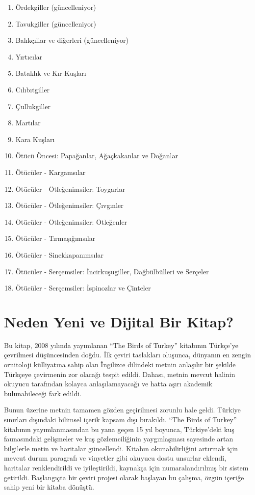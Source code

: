 \documentclass[
  letterpaper,
  DIV=11,
  numbers=noendperiod]{scrreprt}
\providecommand{\tightlist}{%
  \setlength{\itemsep}{0pt}\setlength{\parskip}{0pt}}\usepackage{longtable,booktabs,array}
\begin{document}
\begin{enumerate}
\def\labelenumi{\arabic{enumi}.}
\tightlist
\item
  Ördekgiller (güncelleniyor)
\item
  Tavukgiller (güncelleniyor)
\item
  Balıkçıllar ve diğerleri (güncelleniyor)
\item
  Yırtıcılar
\item
  Bataklık ve Kır Kuşları
\item
  Cılıbıtgiller
\item
  Çullukgiller
\item
  Martılar
\item
  Kara Kuşları
\item
  Ötücü Öncesi: Papağanlar, Ağaçkakanlar ve Doğanlar
\item
  Ötücüler - Kargamsılar
\item
  Ötücüler - Ötleğenimsiler: Toygarlar
\item
  Ötücüler - Ötleğenimsiler: Çıvgınler
\item
  Ötücüler - Ötleğenimsiler: Ötleğenler
\item
  Ötücüler - Tırmaşığımsılar
\item
  Ötücüler - Sinekkapanımsılar
\item
  Ötücüler - Serçemsiler: İncirkuşugiller, Dağbülbülleri ve Serçeler
\item
  Ötücüler - Serçemsiler: İspinozlar ve Çinteler
\end{enumerate}

\section*{Neden Yeni ve Dijital Bir
Kitap?}\label{neden-yeni-ve-dijital-bir-kitap}


Bu kitap, 2008 yılında yayımlanan ``The Birds of Turkey'' kitabının
Türkçe'ye çevrilmesi düşüncesinden doğdu. İlk çeviri taslakları
oluşunca, dünyanın en zengin ornitoloji külliyatına sahip olan İngilizce
dilindeki metnin anlaşılır bir şekilde Türkçeye çevirmenin zor olacağı
tespit edildi. Dahası, metnin mevcut halinin okuyucu tarafından kolayca
anlaşılamayacağı ve hatta aşırı akademik bulunabileceği fark edildi.

Bunun üzerine metnin tamamen gözden geçirilmesi zorunlu hale geldi.
Türkiye sınırları dışındaki bilimsel içerik kapsam dışı bırakıldı. ``The
Birds of Turkey'' kitabının yayımlanmasından bu yana geçen 15 yıl
boyunca, Türkiye'deki kuş faunasındaki gelişmeler ve kuş gözlemciliğinin
yaygınlaşması sayesinde artan bilgilerle metin ve haritalar güncellendi.
Kitabın okunabilirliğini artırmak için mevcut durum paragrafı ve
vinyetler gibi okuyucu dostu unsurlar eklendi, haritalar renklendirildi
ve iyileştirildi, kaynakça için numaralandırılmış bir sistem getirildi.
Başlangıçta bir çeviri projesi olarak başlayan bu çalışma, özgün içeriğe
sahip yeni bir kitaba dönüştü.
\end{document}
